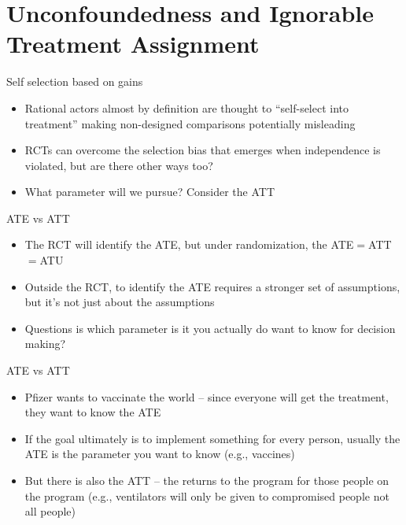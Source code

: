 \documentclass{beamer}
\begin{document}
\section{Unconfoundedness and Ignorable Treatment Assignment}


\begin{frame}{Self selection based on gains}

\begin{itemize}

\item Rational actors almost by definition are thought to ``self-select into treatment'' making non-designed comparisons potentially misleading 
\item RCTs can overcome the selection bias that emerges when independence is violated, but are there other ways too?
\item What parameter will  we pursue?  Consider the ATT

\end{itemize}

\end{frame}



\begin{frame}{ATE vs ATT}

\begin{itemize}

\item The RCT will identify the ATE, but under randomization, the ATE$=$ATT$=$ATU
\item Outside the RCT, to identify the ATE requires a stronger set of assumptions, but it's not just about the assumptions
\item Questions is which parameter is it you actually do want to know for decision making?  

\end{itemize}

\end{frame}





\begin{frame}{ATE vs ATT}

\begin{itemize}
\item Pfizer wants to vaccinate the world -- since everyone will get the treatment, they want to know the ATE
\item If the goal ultimately is to implement something for every person, usually the ATE is the parameter you want to know (e.g., vaccines)
\item But there is also the ATT -- the returns to the program for those people on the program (e.g., ventilators will only be given to compromised people not all people)
\end{itemize}

\end{frame}
\end{document}

